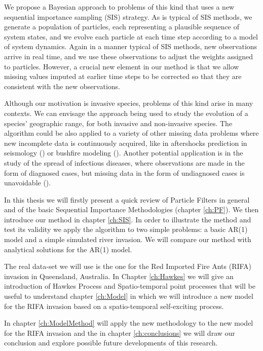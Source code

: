 We propose a Bayesian approach to problems of this kind that uses a new sequential importance sampling (SIS) strategy. As is typical of SIS methods, we generate a population of particles, each representing a plausible sequence of system states, and we evolve each particle at each time step according to a model of system dynamics. Again in a manner typical of SIS methods, new observations arrive in real time, and we use these observations to adjust the weights assigned to particles. However, a crucial new element in our method is that we allow missing values imputed at earlier time steps to be corrected so that they are consistent with the new observations.

Although our motivation is invasive species, problems of this kind arise in many contexts. We can envisage the approach being used to study the evolution of a species' geographic range, for both invasive and non-invasive species. The algorithm could be also applied to a variety of other missing data problems where new incomplete data is continuously acquired, like in aftershocks prediction in seismology (\cite{Seif}) or bushfire modeling (\cite{Beer}). Another potential application is in the study of the spread of infectious diseases, where observations are made in the form of diagnosed cases, but missing data in the form of undiagnosed cases is unavoidable (\cite{O'Neill}). 

In this thesis we will firstly present a quick review of Particle Filters in general and of the basic Sequential Importance Methodologies (chapter \ref{ch:PF}). We then introduce our method in chapter \ref{ch:SIS}. In order to illustrate the method and test its validity we apply the algorithm to two simple problems: a basic AR(1) model and a simple simulated river invasion. We will compare our method with analytical solutions for the AR(1) model.

The real data-set we will use is the one for the Red Imported Fire Ants (RIFA) invasion in Queensland, Australia. In Chapter \ref{ch:Hawkes} we will give an introduction of Hawkes Process and Spatio-temporal point processes that will be useful to understand chapter \ref{ch:Model} in which we will introduce a new model for the RIFA invasion based on a spatio-temporal self-exciting process.

In chapter \ref{ch:ModelMethod} will apply the new methodology to the new model for the RIFA invasion and the in chapter \ref{ch:conclusions} we will draw our conclusion and explore possible future developments of this research.

